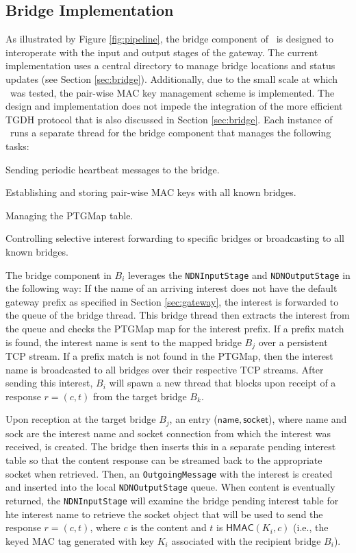 \subsection{Bridge Implementation}
As illustrated by Figure \ref{fig:pipeline}, the bridge component of \sink\ is designed to interoperate with the input and output stages of the gateway. The current implementation uses a central directory to manage bridge locations and status updates (see Section \ref{sec:bridge}). Additionally, due to the small scale at which \sink\ was tested, the pair-wise MAC key management scheme is implemented. The design and implementation does not impede the integration of the more efficient TGDH protocol that is also discussed in Section \ref{sec:bridge}. Each instance of \sink\ runs a separate thread for the bridge component that manages the following tasks:
\begin{compactitem}
	\item Sending periodic heartbeat messages to the bridge.
	\item Establishing and storing pair-wise MAC keys with all known bridges.
	\item Managing the {\sf PTGMap} table.
	\item Controlling selective interest forwarding to specific bridges or broadcasting to all known bridges.
\end{compactitem}

The bridge component in $B_i$ leverages the {\tt NDNInputStage} and {\tt NDNOutputStage} in the following way: If the name of an arriving interest does not have the default gateway prefix as specified in Section \ref{sec:gateway}, the interest is forwarded to the queue of the bridge thread. This bridge thread then extracts the interest from the queue and checks the {\sf PTGMap} map for the interest prefix. If a prefix match is found, the interest name is sent to the mapped bridge $B_j$ over a persistent TCP stream. If a prefix match is not found in the {\sf PTGMap}, then the interest name is broadcasted to all bridges over their respective TCP streams. After sending this interest, $B_i$ will spawn a new thread that blocks upon receipt of a response $r = (c,t)$ from the target bridge $B_k$. 

Upon reception at the target bridge $B_j$, an entry ($\mathsf{name}, \mathsf{socket}$), where {\sf name} and {\sf sock} are the interest name and socket connection from which the interest was received, is created. The bridge then inserts this in a separate pending interest table so that the content response can be streamed back to the appropriate socket when retrieved. Then, an {\tt OutgoingMessage} with the interest is created and inserted into the local {\tt NDNOutputStage} queue. When content is eventually returned, the {\tt NDNInputStage} will examine the bridge pending interest table for hte interest name to retrieve the socket object that will be used to send the response $r = (c,t)$, where $c$ is the content and $t$ is $\mathsf{HMAC}(K_i, c)$ (i.e., the keyed MAC tag generated with key $K_i$ associated with the recipient bridge $B_i$).

